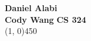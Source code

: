 \documentclass[12pt]{article}
\begin{document}
\noindent \textbf{Daniel Alabi} \\
\textbf{Cody Wang}
\hfill
\textbf{CS 324}\\
\line(1, 0){450}
\end{document}
